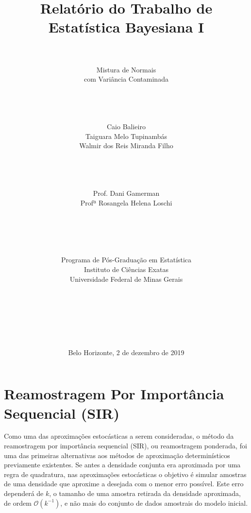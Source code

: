 \documentclass[12pt,reqno,a4paper,oneside]{article}
\begin{document}
\title{\huge Relatório do Trabalho de\\
	Estatística Bayesiana I}
\author{\\
	\\
	\huge Mistura de Normais\\
	\huge com Variância Contaminada\\
	\\
	\\
	\\
	\\
	\Large Caio Balieiro\\
	\Large Taiguara Melo Tupinambás\\
	\Large Walmir dos Reis Miranda Filho\\
	\\
	\\
	\\
	\\
	\Large Prof. Dani Gamerman\\
	\Large Profª Rosangela Helena Loschi\\
	\\
	\\
	\\
	\\
	\\
	Programa de Pós-Graduação em Estatística\\
	Instituto de Ciências Exatas\\
	Universidade Federal de Minas Gerais\\
	\\
	\\
	\\
	\\
	\\
	\\}
\date{Belo Horizonte, 2 de dezembro de 2019}
\maketitle

\newpage




\section{Reamostragem Por Importância Sequencial (SIR)}\label{sir}

Como uma das aproximações estocásticas a serem consideradas, o método da reamostragem por importância sequencial (SIR), ou reamostragem ponderada, foi uma das primeiras alternativas aos métodos de aproximação determinísticos previamente existentes. Se antes a densidade conjunta era aproximada por uma regra de quadratura, nas aproximações estocásticas o objetivo é simular amostras de uma densidade que aproxime a desejada com o menor erro possível. Este erro dependerá de $k$, o tamanho de uma amostra retirada da densidade aproximada, de ordem $\mathcal{O}(k^{-1})$, e não mais do conjunto de dados amostrais do modelo inicial.
\end{document}
